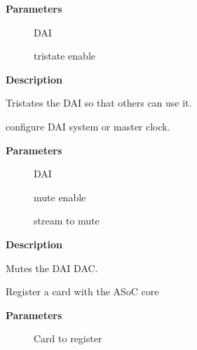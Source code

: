 \documentclass[a4paper,8pt,english]{sphinxmanual}
\begin{document}
\textbf{Parameters}
\begin{description}
\item[{}] \leavevmode
DAI

\item[{}] \leavevmode
tristate enable

\end{description}

\textbf{Description}

Tristates the DAI so that others can use it.

\begin{fulllineitems}
\label{sound/kernel-api/alsa-driver-api:c.snd_soc_dai_digital_mute}
configure DAI system or master clock.

\end{fulllineitems}


\textbf{Parameters}
\begin{description}
\item[{}] \leavevmode
DAI

\item[{}] \leavevmode
mute enable

\item[{}] \leavevmode
stream to mute

\end{description}

\textbf{Description}

Mutes the DAI DAC.

\begin{fulllineitems}
\label{sound/kernel-api/alsa-driver-api:c.snd_soc_register_card}
Register a card with the ASoC core

\end{fulllineitems}


\textbf{Parameters}
\begin{description}
\item[{}] \leavevmode
Card to register

\end{description}
\end{document}
